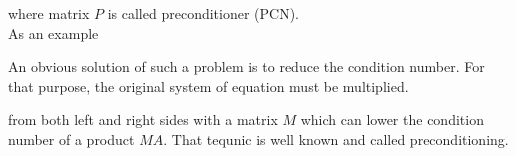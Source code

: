 where matrix $P$ is called preconditioner (PCN).\\

As an example





An obvious solution of such a problem is to reduce the condition number. For that purpose, the original system of equation must be multiplied. 

from both left and right sides with a matrix $M$ which can lower the condition number of a product $MA$. That tequnic is well known and called preconditioning. 


